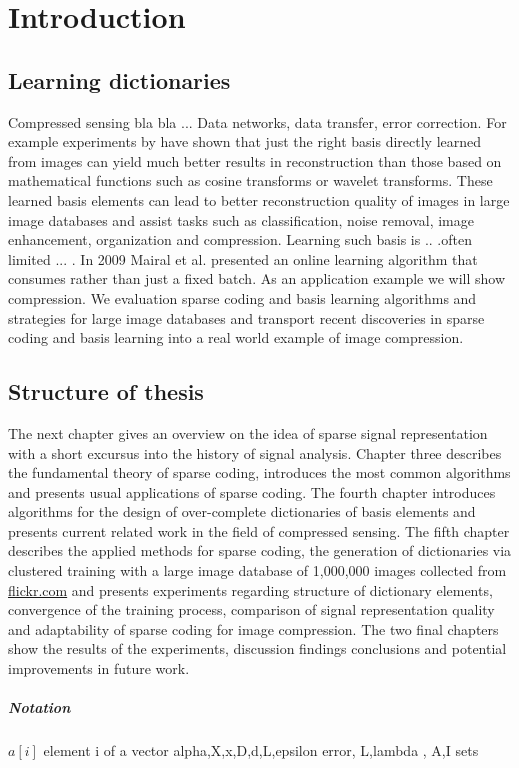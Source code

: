 \chapter{Introduction}
\label{sec:introduction}
\section{Learning dictionaries} %
Compressed sensing bla bla ...
Data networks, data transfer, error correction. For example experiments by
\cite{} have shown that just the right basis directly learned from images can
yield much better results in reconstruction than those based on mathematical
functions such as cosine transforms or wavelet\cite{Elad2006,Mairal2010}
transforms. These learned basis elements can lead to better reconstruction
quality of images in large image databases and assist tasks such as
classification, noise removal, image enhancement, organization and compression. 
Learning such basis is .. .often limited ... . In 2009 Mairal et
al.\cite{Mairal2009} presented an online learning algorithm that consumes 
rather than just a fixed batch. As an application example we will show
compression. We evaluation sparse coding and basis learning algorithms and
strategies for large image databases and transport recent discoveries in sparse
coding and basis learning into a real world example of image compression.

\section{Structure of thesis}
The next chapter gives an overview on the idea of sparse signal
representation with a short excursus into the history of signal analysis.
Chapter three describes the fundamental theory of sparse coding, introduces the
most common algorithms and presents usual applications of sparse coding. The
fourth chapter introduces algorithms for the design of over-complete
dictionaries of basis elements and presents current related work in the field of
compressed sensing. The fifth chapter describes the applied methods for sparse
coding, the generation of dictionaries via clustered training with a large image
database of 1,000,000 images collected from \url{flickr.com} and presents
experiments regarding structure of dictionary elements, convergence of the
training process, comparison of signal representation quality and adaptability
of sparse coding for image compression. The two final chapters show the results
of the experiments, discussion findings conclusions and potential improvements
in future work. 

\paragraph{Notation}
$a[i]$ element i of a vector
alpha,X,x,D,d,L,epsilon error, L,lambda , A,I sets


